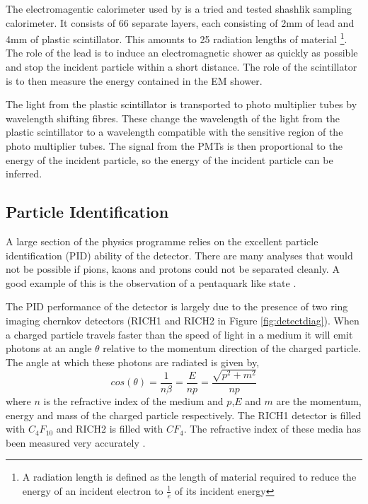The electromagentic calorimeter used by \lhcb is a tried and tested shashlik sampling calorimeter.  It consists of 66 separate layers, each consisting of 2mm of lead and 4mm of plastic scintillator.  This amounts to 25 radiation lengths of material \footnote{ A radiation length is defined as the length of material required to reduce the energy of an incident electron to $\frac{1}{e}$ of its incident energy}.  The role of the lead is to induce an electromagnetic shower as quickly as possible and stop the incident particle within a short distance.  The role of the scintillator is to then measure the energy contained in the EM shower.

The light from the plastic scintillator is transported to photo multiplier tubes by wavelength shifting fibres.  These change the wavelength of the light from the plastic scintillator to a wavelength compatible with the sensitive region of the photo multiplier tubes.  The signal from the PMTs is then proportional to the energy of the incident particle, so the energy of the incident particle can be inferred.

\subsection{Particle Identification}
\label{sec:Particle Identification}
A large section of the \lhcb physics programme relies on the excellent particle identification (PID) ability of the \lhcb detector.  There are many analyses that would not be possible if pions, kaons and protons could not be separated cleanly. A good example of this is the observation of a pentaquark like state \cite{LHCb-PAPER-2015-029}.

The PID performance of the \lhcb detector is largely due to the presence of two ring imaging chernkov detectors (RICH1 and RICH2 in Figure \ref{fig:detectdiag}).  When a charged particle travels faster than the speed of light in a medium it will emit photons at an angle $\theta$ relative to the momentum direction of the charged particle.  The angle at which these photons are radiated is given by,
\begin{equation}
  cos(\theta)=\frac{1}{n\beta}=\frac{E}{np}=\frac{\sqrt{p^2+m^2}}{np}
\end{equation}
where $n$ is the refractive index of the medium and $p$,$E$ and $m$ are the momentum, energy and mass of the charged particle respectively.  The RICH1 detector is filled with $C_4F_{10}$ and RICH2 is filled with $CF_4$.  The refractive index of these media has been measured very accurately \cite{LHCb-DP-2012-003}.

